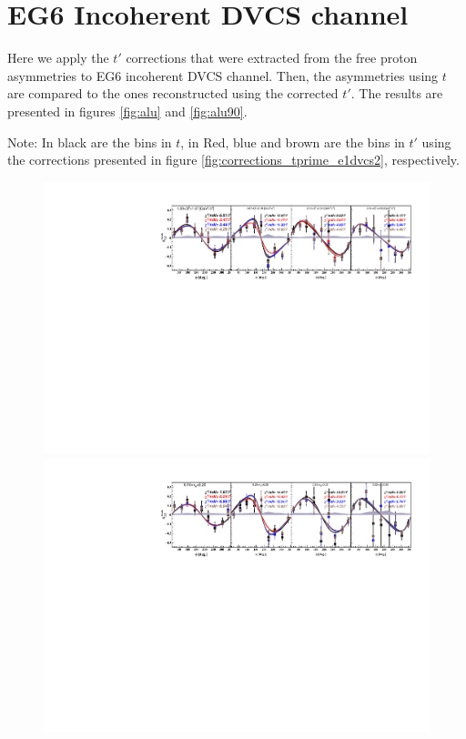 \documentclass[a4paper,11pt,twoside]{article}
\begin{document}
\section{EG6 Incoherent DVCS channel}
Here we apply the $t'$ corrections that were extracted from the free proton 
asymmetries to EG6 incoherent DVCS channel. Then, the asymmetries using $t$ are 
compared to the ones reconstructed using the corrected $t'$. The results are 
presented in figures \ref{fig:alu} and \ref{fig:alu90}. 

Note: In black are the bins in $t$, in Red, blue and brown are the bins in $t'$ 
using the corrections presented in figure \ref{fig:corrections_tprime_e1dvcs2}, 
respectively.

\begin{figure}[tb]
   \centering
\includegraphics[width=18cm]{fig/t_tprime_ALU_phi_p_Q2.pdf}
\includegraphics[width=18cm]{fig/t_tprime_ALU_phi_p_x.pdf}

\end{figure}
\end{document}
